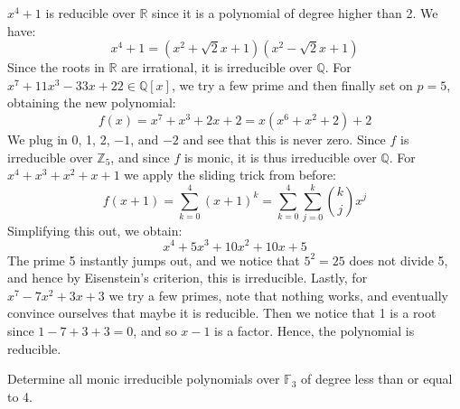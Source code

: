 \documentclass{article}                                                        %
\begin{document}
    \begin{solution}
        $x^{4}+1$ is reducible over $\mathbb{R}$ since it is a polynomial of
        degree higher than 2. We have:
        \begin{equation}
            x^{4}+1=(x^{2}+\sqrt{2}x+1)(x^{2}-\sqrt{2}x+1)
        \end{equation}
        Since the roots in $\mathbb{R}$ are irrational, it is irreducible over
        $\mathbb{Q}$. For $x^{7}+11x^{3}-33x+22\in\mathbb{Q}[x]$, we try a few
        prime and then finally set on $p=5$, obtaining the new polynomial:
        \begin{equation}
            f(x)=x^{7}+x^{3}+2x+2=x(x^{6}+x^{2}+2)+2
        \end{equation}
        We plug in 0, 1, 2, $\minus{1}$, and $\minus{2}$ and see that this is
        never zero. Since $f$ is irreducible over $\mathbb{Z}_{5}$, and since
        $f$ is monic, it is thus irreducible over $\mathbb{Q}$. For
        $x^{4}+x^{3}+x^{2}+x+1$ we apply the sliding trick from before:
        \begin{equation}
            f(x+1)=\sum_{k=0}^{4}(x+1)^{k}
            =\sum_{k=0}^{4}\sum_{j=0}^{k}\binom{k}{j}x^{j}
        \end{equation}
        Simplifying this out, we obtain:
        \begin{equation}
            x^{4}+5x^{3}+10x^{2}+10x+5
        \end{equation}
        The prime 5 instantly jumps out, and we notice that $5^{2}=25$ does not
        divide 5, and hence by Eisenstein's criterion, this is irreducible.
        Lastly, for $x^{7}-7x^{2}+3x+3$ we try a few primes, note that nothing
        works, and eventually convince ourselves that maybe it is reducible.
        Then we notice that 1 is a root since
        $1-7+3+3=0$, and so $x-1$ is a factor. Hence, the polynomial is
        reducible.
    \end{solution}
    \begin{problem}
        Determine all monic irreducible polynomials over $\mathbb{F}_{3}$ of
        degree less than or equal to 4.
    \end{problem}
\end{document}
